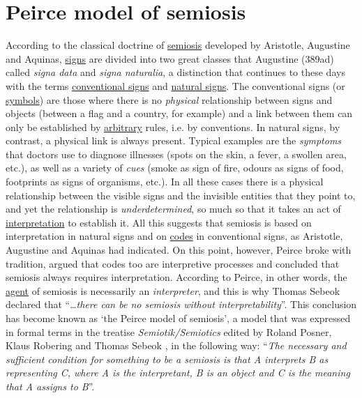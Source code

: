 \documentclass[12pt]{article}
\begin{document}
\hypertarget{peirce_model_of_semiosis}{}
\section{Peirce model of semiosis}
According to the classical doctrine of \hyperlink{semiosis}{semiosis} developed by Aristotle, Augustine and Aquinas, \hyperlink{signs}{signs} are divided into two great classes that Augustine (389ad) called \textit{signa data} and \textit{signa naturalia}, a distinction that continues to these days with the terms \hyperlink{conventional_signs}{conventional signs} and \hyperlink{natural_signs}{natural signs}. The conventional signs (or \hyperlink{icons_indexes_and_symbols}{symbols}) are those where there is no \textit{physical} relationship between signs and objects (between a flag and a country, for example) and a link between them can only be established by \hyperlink{arbitrariness}{arbitrary} rules, i.e. by conventions. In natural signs, by contrast, a physical link is always present. Typical examples are the \textit{symptoms} that doctors use to diagnose illnesses (spots on the skin, a fever, a swollen area, etc.), as well as a variety of \textit{cues} (smoke as sign of fire, odours as signs of food, footprints as signs of organisms, etc.). In all these cases there is a physical relationship between the visible signs and the invisible entities that they point to, and yet the relationship is \textit{underdetermined}, so much so that it takes an act of \hyperlink{interpretation}{interpretation} to establish it. All this suggests that semiosis is based on interpretation in natural signs and on \hyperlink{code}{codes} in conventional signs, as Aristotle, Augustine and Aquinas had indicated. On this point, however, Peirce broke with tradition, argued that codes too are interpretive processes and concluded that semiosis always requires interpretation. According to Peirce, in other words, the \hyperlink{agent}{agent} of semiosis is necessarily an \textit{interpreter}, and this is why Thomas Sebeok \cite{sebeok01:_biosemiotics} declared that ``\ldots \textit{there can be no semiosis without interpretability}''. This conclusion has become known as `the Peirce model of semiosis', a model that was expressed in formal terms in the treatise \textit{Semiotik/Semiotics} edited by Roland Posner, Klaus Robering and Thomas Sebeok \cite{posner97:_semiotik_semiotics}, in the following way: ``\textit{The necessary and sufficient condition for something to be a semiosis is that A interprets B as representing C, where A is the interpretant, B is an object and C is the meaning that A assigns to B}''.
\end{document}
